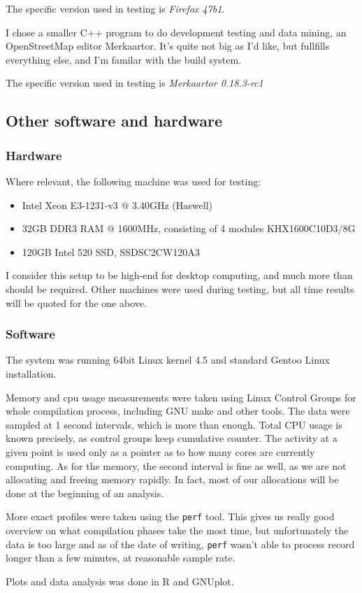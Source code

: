 The specific version used in testing is {\it Firefox 47b1}.

I chose a smaller C++ program to do development testing and data mining, an
OpenStreetMap editor Merkaartor. It's quite not big as I'd like, but fullfills
everything else, and I'm familar with the build system. 

The specific version used in testing is {\it Merkaartor 0.18.3-rc1}

\subsection{Other software and hardware}

\subsubsection{Hardware}

Where relevant, the following machine was used for testing:

\begin{itemize}
	\item Intel Xeon E3-1231-v3 @ 3.40GHz (Haswell)
	\item 32GB DDR3 RAM @ 1600MHz, consisting of 4 modules KHX1600C10D3/8G
	\item 120GB Intel 520 SSD, SSDSC2CW120A3
\end{itemize}

I consider this setup to be high-end for desktop computing, and much more than
should be required. Other machines were used during testing, but all time
results will be quoted for the one above.

\subsubsection{Software}

The system was running 64bit Linux kernel 4.5 and standard Gentoo Linux
installation. 

Memory and cpu usage measurements were taken using Linux Control Groups for
whole compilation process, including GNU make and other tools. The data were
sampled at 1 second intervals, which is more than enough. Total CPU usage is
known precisely, as control groups keep cumulative counter. The activity at a
given point is used only as a pointer as to how many cores are currently
computing. As for the memory, the second interval is fine as well, as we are not
allocating and freeing memory rapidly. In fact, most of our allocations will be
done at the beginning of an analysis.

More exact profiles were taken using the {\tt perf} tool. This gives us really
good overview on what compilation phases take the most time, but unfortunately
the data is too large and as of the date of writing, {\tt perf} wasn't able to
process record longer than a few minutes, at reasonable sample rate.

Plots and data analysis was done in R and GNUplot.
